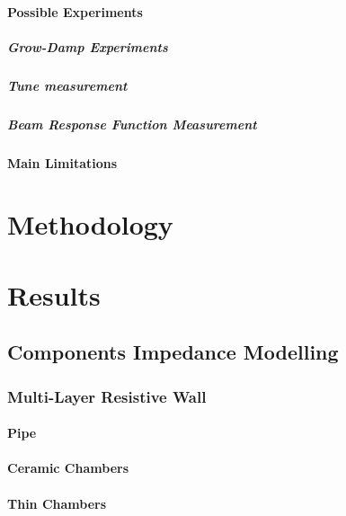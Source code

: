 \documentclass[
	12pt,				%
	openright,			%
	oneside,			%
	a4paper,		%
	chapter=TITLE,		%
	section=TITLE,		%
    brazil,				%
	english,			%
	sumario=tradicional,
	]{abntex2}
\begin{document}
      \subsubsection{Possible Experiments}
        \paragraph{Grow-Damp Experiments}
        \paragraph{Tune measurement}
        \paragraph{Beam Response Function Measurement}
      \subsubsection{Main Limitations}

\chapter{Methodology}
  \section{}

\chapter{Results}
  \section{Components Impedance Modelling}
    \subsection{Multi-Layer Resistive Wall}
      \subsubsection{Pipe}
      \subsubsection{Ceramic Chambers}
      \subsubsection{Thin Chambers}
\end{document}
